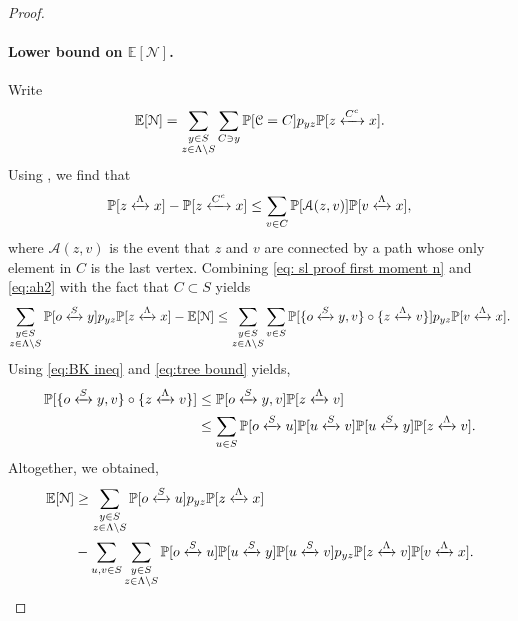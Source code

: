 \documentclass[11pt,a4paper]{article}
\numberwithin{equation}{section}
\theoremstyle{plain}
\theoremstyle{definition}
\newcommand{\connect}{\xleftrightarrow}
\begin{document}
\begin{proof}
\paragraph{Lower bound on $\mathbb E[\mathcal N]$.} Write
\begin{equation}\label{eq: sl proof first moment n}
	\mathbb E[\mathcal N]=\sum_{\substack{y\in S\\z\in \Lambda \setminus S}}\sum_{C \ni y}\mathbb P[\mathcal C= C]p_{yz}\mathbb P[z \connect{C^c\:}x].
\end{equation}
Using \cite[Proposition~5.2]{AizenmanNewmanTreeGraphInequalities1984}, we find that
\begin{equation}\label{eq:ah2}
	\mathbb P[z \connect{\Lambda\:}x]-\mathbb P[z\connect{C^c\:}x]\leq \sum_{v\in C}\mathbb P[\mathcal A(z,v)]\mathbb P[v\connect{\Lambda\:} x],
\end{equation}
where $\mathcal A(z,v)$ is the event that $z$ and $v$ are connected by a path whose only element in $C$ is the last vertex. Combining \eqref{eq: sl proof first moment n} and \eqref{eq:ah2} with the fact that $C\subset S$ yields
\begin{equation}
	\sum_{\substack{y\in S\\z\in \Lambda \setminus S}}\mathbb P[o\connect{S\:}y]p_{yz}\mathbb P[z \connect{\Lambda\:}x]-\mathbb E[\mathcal N]\leq \sum_{\substack{y\in S\\ z\in \Lambda\setminus S}}\sum_{v\in S}\mathbb P[\{o\connect{S\:}y, v\}\circ \{z \connect{\Lambda\:}v\}]p_{yz}\mathbb P[v\connect{\Lambda\:} x].
\end{equation}
Using \eqref{eq:BK ineq} and \eqref{eq:tree bound} yields,
\begin{align}
	\mathbb P[\{o\connect{S\:}y, v\}\circ \{z \connect{\Lambda\:}v\}]&\leq \mathbb P[o\connect{S\:}y,v]\mathbb P[z\connect{\Lambda\:}v]\notag\\&\leq \sum_{u\in S}\mathbb P[o\connect{S\:}u]\mathbb P[u\connect{S\:}v]\mathbb P[u\connect{S\:}y]\mathbb P[z\connect{\Lambda\:}v].
\end{align}
Altogether, we obtained,
\begin{align}
	\mathbb E[\mathcal N]&\geq \sum_{\substack{y\in S\\ z\in \Lambda\setminus S}}\mathbb P[o\connect{S\:}u]p_{yz} \mathbb P[z\connect{\Lambda\:}x]\notag
	\\&-\sum_{u,v\in S}\sum_{\substack{y\in S\\ z\in \Lambda\setminus S}}\mathbb P[o\connect{S\:}u]\mathbb P[u\connect{S\:}y]\mathbb P[u\connect{S\:}v] p_{yz}\mathbb P[z\connect{\Lambda\:}v]\mathbb P[v\connect{\Lambda\:}x] .\label{eq:proofSL2}
\end{align}

\end{proof}
\end{document}
